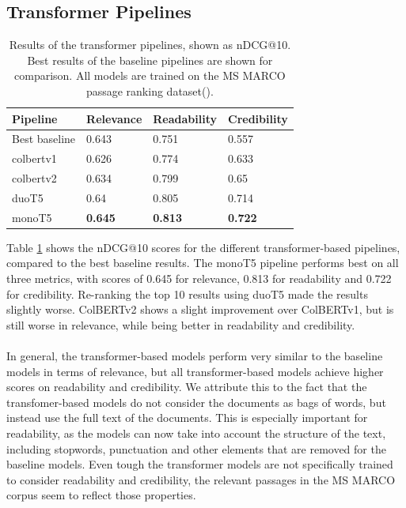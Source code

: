 \subsection{Transformer Pipelines}
\begin{table}[tb]
\centering
\begin{tabularx}{\textwidth}{lXXX}
Pipeline    & Relevance          & Readability        & Credibility        \\ \hline
Best baseline    & 0.643 & 0.751 & 0.557 \\
colbertv1      & 0.626 & 0.774 & 0.633 \\
colbertv2       & 0.634 & 0.799 & 0.65  \\
duoT5            & 0.64  & 0.805 & 0.714 \\
monoT5           & \textbf{0.645} & \textbf{0.813} & \textbf{0.722}
\end{tabularx}
\caption{Results of the transformer pipelines, shown as nDCG@10. Best results of the baseline pipelines are shown for comparison. All models are trained on the MS MARCO passage ranking dataset(\cite{bajaj:2016}).}
\label{tab:transformer_pipelines}
\end{table}
Table \ref{tab:transformer_pipelines} shows the nDCG@10 scores for the different transformer-based pipelines, compared to the best baseline results.
The monoT5 pipeline performs best on all three metrics, with scores of 0.645 for relevance, 0.813 for readability and 0.722 for credibility.
Re-ranking the top 10 results using duoT5 made the results slightly worse.
ColBERTv2 shows a slight improvement over ColBERTv1, but is still worse in relevance, while being better in readability and credibility.
\\\\
In general, the transformer-based models perform very similar to the baseline models in terms of relevance, but all transformer-based models achieve higher scores on readability and credibility.
We attribute this to the fact that the transfomer-based models do not consider the documents as bags of words, but instead use the full text of the documents.
This is especially important for readability, as the models can now take into account the structure of the text, including stopwords, punctuation and other elements that are removed for the baseline models.
Even tough the transformer models are not specifically trained to consider readability and credibility, the relevant passages in the MS MARCO corpus seem to reflect those properties.

